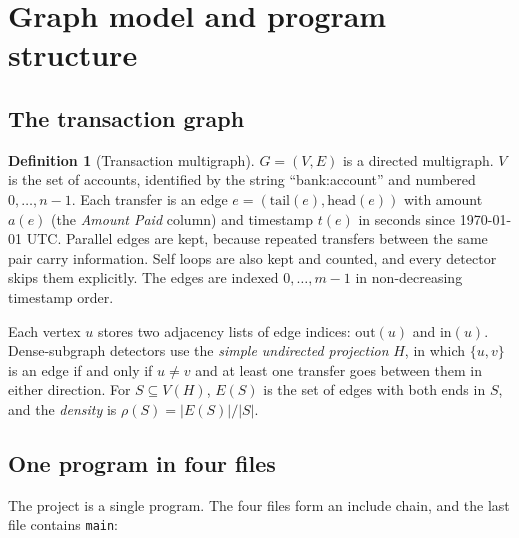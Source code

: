 \documentclass[11pt,a4paper]{article}
\theoremstyle{definition}
\newtheorem{definition}{Definition}
\begin{document}
\section{Graph model and program structure}

\subsection{The transaction graph}
\begin{definition}[Transaction multigraph]
$G = (V, E)$ is a directed multigraph. $V$ is the set of accounts, identified by the string ``bank:account'' and numbered $0, \dots, n - 1$. Each transfer is an edge $e = (\text{tail}(e), \text{head}(e))$ with amount $a(e)$ (the \emph{Amount Paid} column) and timestamp $t(e)$ in seconds since 1970-01-01 UTC. Parallel edges are kept, because repeated transfers between the same pair carry information. Self loops are also kept and counted, and every detector skips them explicitly. The edges are indexed $0, \dots, m - 1$ in non-decreasing timestamp order.
\end{definition}

Each vertex $u$ stores two adjacency lists of edge indices: $\text{out}(u)$ and $\text{in}(u)$. Dense-subgraph detectors use the \emph{simple undirected projection} $H$, in which $\{u, v\}$ is an edge if and only if $u \ne v$ and at least one transfer goes between them in either direction. For $S \subseteq V(H)$, $E(S)$ is the set of edges with both ends in $S$, and the \emph{density} is $\rho(S) = |E(S)| / |S|$.

\subsection{One program in four files}
The project is a single program. The four files form an include chain, and the last file contains \texttt{main}:

\begin{center}
\end{center}
\end{document}
